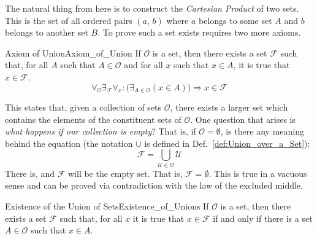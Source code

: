         The natural thing from here is to construct the
        \textit{Cartesian Product} of two sets. This is
        the set of all ordered pairs $(a,\,b)$ where $a$
        belongs to some set $A$ and $b$ belongs to another set $B$. To prove
        such a set exists requires two more axioms.
        \begin{faxiom}{Axiom of Union}{Axiom_of_Union}
            If $\mathcal{O}$ is a set, then there exists a set $\mathcal{F}$
            such that, for all $A$ such that $A\in\mathcal{O}$ and for all
            $x$ such that $x\in{A}$, it is true that $x\in\mathcal{F}$.%
            \begin{equation*}
                \forall_{\mathcal{O}}\exists_{\mathcal{F}}\forall_{x}:
                \big(\exists_{A\in\mathcal{O}}(x\in{A})\big)
                \Rightarrow{x}\in\mathcal{F}
            \end{equation*}
        \end{faxiom}
        This states that, given a collection of sets $\mathcal{O}$, there exists
        a larger set which contains the elements of the constituent sets of
        $\mathcal{O}$. One question that arises is
        \textit{what happens if our collection is empty}? That is, if
        $\mathcal{O}=\emptyset$, is there any meaning behind the equation
        (the notation $\cup$ is defined in Def.~\ref{def:Union_over_a_Set}):
        \begin{equation}
            \mathcal{F}=\bigcup_{\mathcal{U}\in\mathcal{O}}\mathcal{U}
        \end{equation}
        There is, and $\mathcal{F}$ will be the empty set. That is,
        $\mathcal{F}=\emptyset$. This is true in a vacuous sense and can be
        proved via contradiction with the law of the excluded middle.
        \begin{ltheorem}{Existence of the Union of Sets}{Existence_of_Unions}
            If $\mathcal{O}$ is a set, then there exists a set $\mathcal{F}$
            such that, for all $x$ it is true that $x\in\mathcal{F}$ if and
            only if there is a set $A\in\mathcal{O}$ such that $x\in{A}$.
        \end{ltheorem}
